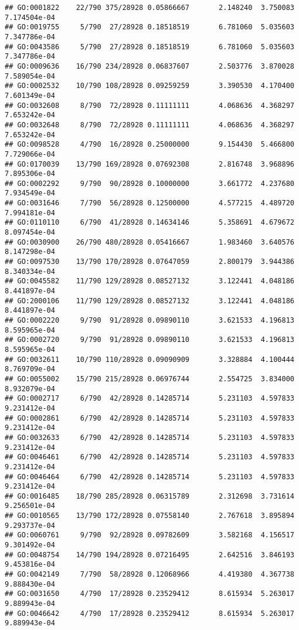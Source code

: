 \documentclass[
]{article}
\begin{document}
\begin{verbatim}
## GO:0001822    22/790 375/28928 0.05866667       2.148240  3.750083 7.174504e-04
## GO:0019755     5/790  27/28928 0.18518519       6.781060  5.035603 7.347786e-04
## GO:0043586     5/790  27/28928 0.18518519       6.781060  5.035603 7.347786e-04
## GO:0009636    16/790 234/28928 0.06837607       2.503776  3.870028 7.589054e-04
## GO:0002532    10/790 108/28928 0.09259259       3.390530  4.170400 7.601349e-04
## GO:0032608     8/790  72/28928 0.11111111       4.068636  4.368297 7.653242e-04
## GO:0032648     8/790  72/28928 0.11111111       4.068636  4.368297 7.653242e-04
## GO:0098528     4/790  16/28928 0.25000000       9.154430  5.466800 7.729066e-04
## GO:0170039    13/790 169/28928 0.07692308       2.816748  3.968896 7.895306e-04
## GO:0002292     9/790  90/28928 0.10000000       3.661772  4.237680 7.934549e-04
## GO:0031646     7/790  56/28928 0.12500000       4.577215  4.489720 7.994181e-04
## GO:0110110     6/790  41/28928 0.14634146       5.358691  4.679672 8.097454e-04
## GO:0030900    26/790 480/28928 0.05416667       1.983460  3.640576 8.147298e-04
## GO:0097530    13/790 170/28928 0.07647059       2.800179  3.944386 8.340334e-04
## GO:0045582    11/790 129/28928 0.08527132       3.122441  4.048186 8.441897e-04
## GO:2000106    11/790 129/28928 0.08527132       3.122441  4.048186 8.441897e-04
## GO:0002220     9/790  91/28928 0.09890110       3.621533  4.196813 8.595965e-04
## GO:0002720     9/790  91/28928 0.09890110       3.621533  4.196813 8.595965e-04
## GO:0032611    10/790 110/28928 0.09090909       3.328884  4.100444 8.769709e-04
## GO:0055002    15/790 215/28928 0.06976744       2.554725  3.834000 8.932079e-04
## GO:0002717     6/790  42/28928 0.14285714       5.231103  4.597833 9.231412e-04
## GO:0002861     6/790  42/28928 0.14285714       5.231103  4.597833 9.231412e-04
## GO:0032633     6/790  42/28928 0.14285714       5.231103  4.597833 9.231412e-04
## GO:0046461     6/790  42/28928 0.14285714       5.231103  4.597833 9.231412e-04
## GO:0046464     6/790  42/28928 0.14285714       5.231103  4.597833 9.231412e-04
## GO:0016485    18/790 285/28928 0.06315789       2.312698  3.731614 9.256501e-04
## GO:0010565    13/790 172/28928 0.07558140       2.767618  3.895894 9.293737e-04
## GO:0060761     9/790  92/28928 0.09782609       3.582168  4.156517 9.301492e-04
## GO:0048754    14/790 194/28928 0.07216495       2.642516  3.846193 9.453816e-04
## GO:0042149     7/790  58/28928 0.12068966       4.419380  4.367738 9.888430e-04
## GO:0031650     4/790  17/28928 0.23529412       8.615934  5.263017 9.889943e-04
## GO:0046642     4/790  17/28928 0.23529412       8.615934  5.263017 9.889943e-04

\end{verbatim}
\end{document}
